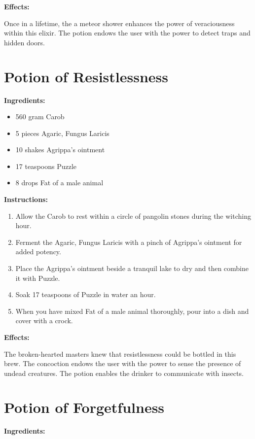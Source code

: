 \documentclass{article}
\begin{document}
\textbf{Effects:}

Once in a lifetime, the a meteor shower enhances the power of veraciousness within this elixir. The potion endows the user with the power to detect traps and hidden doors.

\newpage
\section*{Potion of Resistlessness}

\textbf{Ingredients:}

\begin{itemize}
  \item 560 gram Carob
  \item 5 pieces Agaric, Fungus Laricis
  \item 10 shakes Agrippa's ointment
  \item 17 teaspoons Puzzle
  \item 8 drops Fat of a male animal
\end{itemize}

\textbf{Instructions:}

\begin{enumerate}
  \item Allow the Carob to rest within a circle of pangolin stones during the witching hour.
  \item Ferment the Agaric, Fungus Laricis with a pinch of Agrippa's ointment for added potency.
  \item Place the Agrippa's ointment beside a tranquil lake to dry and then combine it with Puzzle.
  \item Soak 17 teaspoons of Puzzle in water an hour.
  \item When you have mixed Fat of a male animal thoroughly, pour into a dish and cover with a crock.
\end{enumerate}

\textbf{Effects:}

The broken-hearted masters knew that resistlessness could be bottled in this brew. The concoction endows the user with the power to sense the presence of undead creatures. The potion enables the drinker to communicate with insects.

\newpage
\section*{Potion of Forgetfulness}

\textbf{Ingredients:}
\end{document}

